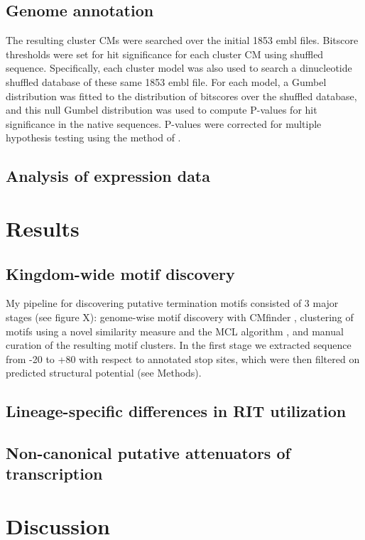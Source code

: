 \subsection{Genome annotation}

The resulting cluster CMs were searched over the initial 1853 embl files. Bitscore thresholds were set for hit significance for each cluster CM using shuffled sequence. Specifically, each cluster model was also used to search a dinucleotide shuffled database of these same 1853 embl file. For each model, a Gumbel distribution was fitted to the distribution of bitscores over the shuffled database, and this null Gumbel distribution was used to compute P-values for hit significance in the native sequences. P-values were corrected for multiple hypothesis testing using the method of \textcite{Benjamini1995}.

\subsection{Analysis of expression data}

\section{Results}

\subsection{Kingdom-wide motif discovery}

My pipeline for discovering putative termination motifs consisted of 3 major stages (see figure X): genome-wise motif discovery with CMfinder  \parencite{Yao2006}, clustering of motifs using a novel similarity measure and the MCL algorithm \parencite{Enright2002}, and manual curation of the resulting motif clusters.  In the first stage we extracted sequence from -20 to +80 with respect to annotated stop sites, which were then filtered on predicted structural potential (see Methods). 

\subsection{Lineage-specific differences in RIT utilization}

\subsection{Non-canonical putative attenuators of transcription}

\section{Discussion}